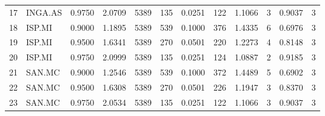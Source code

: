 \begin{table}
\begin{tabular}{llrrrrrrrrrr}
17 & INGA.AS & 0.9750 & 2.0709 & 5389 & 135 & 0.0251 & 122 & 1.1066 & 3 & 0.9037 & 3 \\
18 & ISP.MI & 0.9000 & 1.1895 & 5389 & 539 & 0.1000 & 376 & 1.4335 & 6 & 0.6976 & 3 \\
19 & ISP.MI & 0.9500 & 1.6341 & 5389 & 270 & 0.0501 & 220 & 1.2273 & 4 & 0.8148 & 3 \\
20 & ISP.MI & 0.9750 & 2.0999 & 5389 & 135 & 0.0251 & 124 & 1.0887 & 2 & 0.9185 & 3 \\
21 & SAN.MC & 0.9000 & 1.2546 & 5389 & 539 & 0.1000 & 372 & 1.4489 & 5 & 0.6902 & 3 \\
22 & SAN.MC & 0.9500 & 1.6308 & 5389 & 270 & 0.0501 & 226 & 1.1947 & 3 & 0.8370 & 3 \\
23 & SAN.MC & 0.9750 & 2.0534 & 5389 & 135 & 0.0251 & 122 & 1.1066 & 3 & 0.9037 & 3 \\
\bottomrule
\end{tabular}
\end{table}
